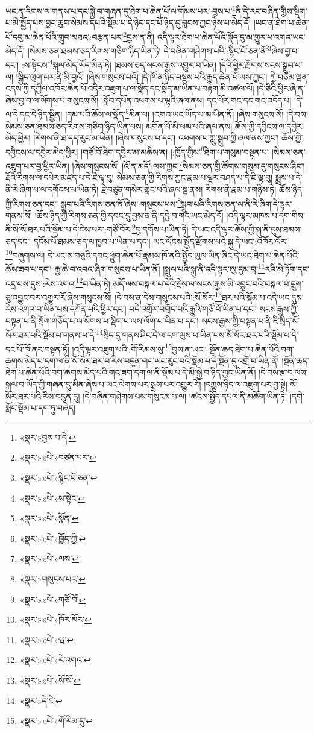 ཡང་ན་རིགས་ལ་གནས་པ་དང་སྐྱེ་བ་གཞན་དུ་ཐེག་པ་ཆེན་པོ་ལ་གོམས་པར་:བྱས་པ་\footnote{«སྣར་»བྱས་པ་དེ་}ནི་དེ་རང་བཞིན་གྱིས་སྡིག་པ་མི་སྤྱོད་པས་བྱང་ཆུབ་སེམས་དཔའི་སྡོམ་པ་དེ་ཉིད་དང་པོ་ཉིད་དུ་བླངས་ཀྱང་ཉེས་པ་མེད་དོ། །ཡང་ན་ཐེག་པ་ཆེན་པོ་དབུ་མ་ཆེན་པོའི་གྲུབ་མཐའ་:བརྩན་པར་\footnote{«སྣར་»«པེ་»བཙན་པར་}བྱས་ན་ནི། འདི་ལྟར་ཐེག་པ་ཆེན་པོའི་སྣོད་དུ་མ་གྱུར་པ་འགའ་ཡང་མེད་དོ། །སེམས་ཅན་ཐམས་ཅད་རིགས་གཅིག་ཉིད་ཡིན་ཏེ། དེ་བཞིན་གཤེགས་པའི་:སྙིང་པོ་ཅན་ནོ་\footnote{«སྣར་»«པེ་»སྙིང་པོ་ཅན་}ཞེས་བྱ་བ་དང་། :ས་སྟེངས་\footnote{«སྣར་»«པེ་»ས་སྟེང་}སྐལ་མེད་ཡོད་མིན་ཏེ། །ཐམས་ཅད་སངས་རྒྱས་འགྱུར་བ་ཡིན། །དེའི་ཕྱིར་རྫོགས་སངས་སྒྲུབ་པ་ལ། །སྒྱིད་ལུག་པར་ནི་མི་བྱའོ། །ཞེས་གསུངས་པའོ། །དེ་ཁོ་ན་ཉིད་བསྡུས་པའི་རྒྱུད་ཆེན་པོ་ལས་ཀྱང་། ཀྱེ་བཅོམ་ལྡན་འདས་ཀྱི་དཀྱིལ་འཁོར་ཆེན་པོ་འདིར་འཇུག་པ་ལ་སྣོད་དང་སྣོད་མ་ཡིན་པ་བརྟག་མི་འཚལ་ལོ། །དེ་ཅིའི་ཕྱིར་ཞེ་ན་ཞེས་བྱ་བ་ལ་སོགས་པ་གསུངས་སོ། །སློབ་དཔོན་འཕགས་པ་ལྷའི་ཞལ་ནས། དང་པོར་གང་དང་གང་འདོད་པ། །དེ་ལ་དེ་དང་དེ་ཉིད་སྦྱིན། །དམ་པའི་ཆོས་ལ་སྣོད་\footnote{«སྣར་»«པེ་»སྣོན་}མིན་པ། །འགའ་ཡང་ཡོད་པ་མ་ཡིན་ནོ། །ཞེས་གསུངས་སོ། །དེ་བས་སེམས་ཅན་ཐམས་ཅད་རིགས་གཅིག་ཉིད་ཡིན་པས། མགོན་པོ་མི་ཕམ་པའི་ཞལ་ནས། ཆོས་ཀྱི་དབྱིངས་ལ་དབྱེར་མེད་ཕྱིར། །རིགས་ནི་ཐ་དད་རུང་མ་ཡིན། །ཞེས་གསུངས་པ་དང་། འཕགས་པ་ཀླུ་སྒྲུབ་ཀྱི་ཞལ་ནས་ཀྱང་། ཆོས་ཀྱི་དབྱིངས་ལ་དབྱེར་མེད་ཕྱིར། །གཙོ་བོ་ཐེག་དབྱེར་མ་མཆིས་ན། །:ཁྱོད་ཀྱིས་\footnote{«སྣར་»«པེ་»ཁྱོད་ཀྱི་}ཐེག་པ་གསུམ་བསྟན་པ། །སེམས་ཅན་འཇུག་པར་བྱ་ཕྱིར་ཡིན། །ཞེས་གསུངས་སོ། །འོ་ན་མདོ་:ལས་ཀྱང་\footnote{«སྣར་»«པེ་»ལས་}སེམས་ཅན་གྱི་ཚོགས་གསུམ་དུ་གསུངས་ཤིང་། རྡོའི་རིགས་ལ་དཔེར་མཛད་པ་དེ་ཇི་ལྟ་བུ། སེམས་ཅན་གྱི་རིགས་ཀྱང་རྣམ་པ་ལྔར་བཤད་པ་དེ་ཇི་ལྟ་བུ། སྨྲས་པ་དེ་ནི་རེ་ཞིག་པ་ལ་དགོངས་པ་ཡིན་ཏེ། རྗེ་བཙུན་གསེར་གླིང་པའི་ཞལ་སྔ་ནས། རིགས་ནི་རྣམ་པ་གཉིས་ཏེ། ཆོས་ཉིད་ཀྱི་རིགས་ཅན་དང་། སྒྲུབ་པའི་རིགས་ཅན་ནོ་ཞེས་:གསུངས་པས་\footnote{«སྣར་»གསུངས་པར་}སྒྲུབ་པའི་རིགས་ཅན་ལ་ནི་རེ་ཞིག་དེ་ལྟར་གནས་སོ། །ཆོས་ཉིད་ཀྱི་རིགས་ཅན་གྱི་དབང་དུ་བྱས་ན་ནི་དབྱེ་བ་གང་ཡང་མེད་དོ། །འདི་ལྟར་མཁས་པ་དག་གིས་ནི་སོ་སོ་ཐར་པའི་སྡོམ་པ་དེ་ངེས་པར་:གཙོ་བོར་\footnote{«སྣར་»«པེ་»གཙོ་བོ་}བྱ་དགོས་པ་ཡིན་ཏེ། དེ་ཡང་འདི་ལྟར་ཆོས་ཀྱི་སྐུ་ནི་དུས་ཐམས་ཅད་དང་། དངོས་པོ་ཐམས་ཅད་ལ་ཁྱབ་པ་ཡིན་པ་དང་། ཡང་ལོངས་སྤྱོད་རྫོགས་པའི་སྐུ་དེ་ཡང་:འཁོར་ལོར་\footnote{«སྣར་»«པེ་»ཁོར་མོར་}བཞུགས་ལ། དེ་ཡང་ས་བཅུའི་དབང་ཕྱུག་ཆེན་པོ་རྣམས་ཁོ་ནའི་སྤྱོད་ཡུལ་ཡིན་ཞིང་དེ་ཡང་ཐེག་པ་ཆེན་པོའི་ཆོས་ཟབ་པ་དང་། རྒྱ་ཆེ་བ་འབའ་ཞིག་གསུངས་པ་ཡིན་ནོ། །སྤྲུལ་པའི་སྐུ་ནི་འདི་ལྟར་ཨུ་དུམ་བཱ་\footnote{«སྣར་»«པེ་»ཝ་}རའི་མེ་ཏོག་དང་འདྲ་བས་དུས་:རེས་འགའ་\footnote{«སྣར་»«པེ་»རེ་འགའ་}བ་ཡིན་ཏེ། མདོ་ལས་བསྐལ་པ་དེའི་རྗེས་ལ་སངས་རྒྱས་མི་འབྱུང་བའི་བསྐལ་པ་དྲུག་ཅུ་འབྱུང་བར་འགྱུར་རོ་ཞེས་གསུངས་སོ། །དེ་བས་ན་དེས་གསུངས་པའི་:སོ་སོར་\footnote{«སྣར་»«པེ་»སོ་སོ་}ཐར་པའི་སྡོམ་པ་འདི་ཡང་དུས་རེས་འགའ་བ་ཡིན་པས་དཀོན་པའི་ཕྱིར་དང་། བདེ་འགྲོར་བགྲོད་པའི་རྒྱུའི་གཙོ་བོ་ཡིན་པ་དང་། སངས་རྒྱས་ཀྱི་བསྟན་པ་ནི་སྲོག་གཅོད་པ་ལ་སོགས་པ་སྡིག་པ་ལས་ལོག་པ་ཡིན་པ་དང་། སངས་རྒྱས་ཀྱི་བསྟན་པ་ནི་ཇི་སྲིད་སོ་སོར་ཐར་པའི་སྡོམ་པ་གནས་པ་དེ་\footnote{«སྣར་»དེ་ཇི་}སྲིད་དུ་གནས་ཤིང་དེ་ལ་རག་ལུས་པ་ཡིན་པས་སོ་སོར་ཐར་པའི་སྡོམ་པ་དེ་དང་པོ་ཁོ་ནར་བསྟན་ཏོ། །འདི་ལྟར་འཇུག་པའི་:གོ་རིམས་སུ་\footnote{«སྣར་»«པེ་»གོ་རིམ་དུ་}བྱས་ན་ཡང་། སྔོན་ཆད་ཐེག་པ་ཆེན་པོའི་བག་ཆགས་མེད་པ་དག་ལ་ནི་སོ་སོར་ཐར་པ་རིས་བདུན་གང་ཡང་རུང་བའི་སྡོམ་པ་དེ་སྔོན་དུ་འགྲོ་བ་ཡིན་ནོ། །སྔོན་ཆད་ཐེག་པ་ཆེན་པོའི་བག་ཆགས་མེད་པའི་གང་ཟག་དག་ལ་ནི་སྡོམ་པ་དེ་མི་སྐྱེ་བ་ཉིད་ཀྱང་ཡིན་ནོ། །དེ་བས་རྩ་བ་ལས་སྐལ་བ་ཡོད་ཀྱི་གཞན་དུ་མིན་ཞེས་པ་ཡང་ལེགས་པར་སྨྲས་པར་འགྱུར་རོ། །དཀྱུས་ཉིད་ལ་འཇུག་པར་བྱ་སྟེ། སོ་སོར་ཐར་པའི་རིས་བདུན་དུ། །དེ་བཞིན་གཤེགས་པས་གསུངས་པ་ལ། །ཚངས་སྤྱོད་དཔལ་ནི་མཆོག་ཡིན་ཏེ། །དགེ་སློང་སྡོམ་པ་དག་ཏུ་བཞེད། 